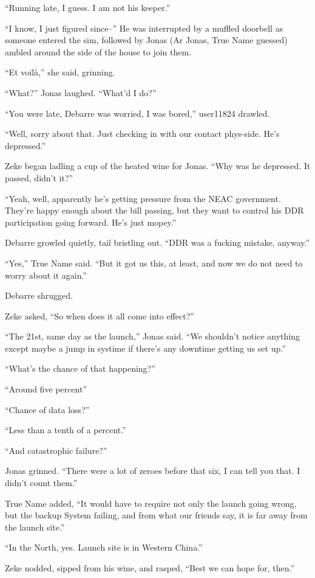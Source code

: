 ``Running late, I guess. I am not his keeper.''

``I know, I just figured since--'' He was interrupted by a muffled doorbell as someone entered the sim, followed by Jonas (Ar Jonas, True Name guessed) ambled around the side of the house to join them.

``Et voilà,'' she said, grinning.

``What?'' Jonas laughed. ``What'd I do?''

``You were late, Debarre was worried, I was bored,'' user11824 drawled.

``Well, sorry about that. Just checking in with our contact phys-side. He's depressed.''

Zeke began ladling a cup of the heated wine for Jonas. ``Why was he depressed. It passed, didn't it?''

``Yeah, well, apparently he's getting pressure from the NEAC government. They're happy enough about the bill passing, but they want to control his DDR participation going forward. He's just mopey.''

Debarre growled quietly, tail bristling out. ``DDR was a fucking mistake, anyway.''

``Yes,'' True Name said. ``But it got us this, at least, and now we do not need to worry about it again.''

Debarre shrugged.

Zeke asked, ``So when does it all come into effect?''

``The 21st, same day as the launch,'' Jonas said. ``We shouldn't notice anything except maybe a jump in systime if there's any downtime getting us set up.''

``What's the chance of that happening?''

``Around five percent''

``Chance of data loss?''

``Less than a tenth of a percent.''

``And catastrophic failure?''

Jonas grinned. ``There were a lot of zeroes before that six, I can tell you that. I didn't count them.''

True Name added, ``It would have to require not only the launch going wrong, but the backup System failing, and from what our friends say, it is far away from the launch site.''

``In the North, yes. Launch site is in Western China.''

Zeke nodded, sipped from his wine, and rasped, ``Best we can hope for, then.''

